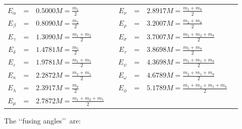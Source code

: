 \documentclass[a4paper,12pt]{report}
\begin{document}
\begin{center}
\begin{tabular}{cclc|cclc}
$E_{\alpha}$ &=& $0.5000 M =\frac{m_{1}}{2}$ && $E_{\nu}$ &=& $2.8917 M =\frac{m_{1}+m_{8}}{2} $ \\
$E_{\beta}$ &=& $0.8090 M =\frac{m_{2}}{2}$ && $E_{\rho}$ &=& $3.2007 M =\frac{m_{2}+m_{8}}{2}$ \\
$E_{\gamma}$ &=& $1.3090 M =\frac{m_{1}+m_{2}}{2}$ && $E_{\sigma}$ &=& $3.7007 M =\frac{m_{1}+m_{2}+m_{8}}{2}$ \\
$E_{\delta}$ &=& $1.4781 M =\frac{m_{5}}{2}$ && $E_{\tau}$ &=& $3.8698 M =\frac{m_{5}+m_{8}}{2}$ \\
$E_{\varepsilon}$ &=& $1.9781 M =\frac{m_{1}+m_{5}}{2}$ && $E_{\psi}$ &=& $4.3698 M =\frac{m_{1}+m_{5}+m_{8}}{2}$ \\
$E_{\kappa}$ &=& $2.2872 M =\frac{m_{2}+m_{5}}{2}$ && $E_{\omega}$ &=& $4.6789 M =\frac{m_{2}+m_{5}+m_{8}}{2}$ \\
$E_{\lambda}$ &=& $2.3917 M =\frac{m_{8}}{2}$ && $E_{\phi}$ &=& $5.1789 M =\frac{m_{1}+m_{2}+m_{5}+m_{8}}{2}$ \\
$E_{\mu}$ &=& $2.7872 M =\frac{m_{1}+m_{2}+m_{5}}{2}$ && \\
\end{tabular}
\end{center}

\vspace{1.5cm}

The \lq\lq fusing angles\rq\rq \, are:
\end{document}
